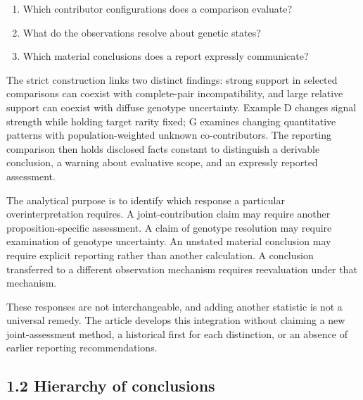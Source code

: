 \documentclass[
]{article}
\providecommand{\tightlist}{%
  \setlength{\itemsep}{0pt}\setlength{\parskip}{0pt}}
\begin{document}
\begin{enumerate}
\def\labelenumi{\arabic{enumi}.}
\tightlist
\item
  Which contributor configurations does a comparison evaluate?
\item
  What do the observations resolve about genetic states?
\item
  Which material conclusions does a report expressly communicate?
\end{enumerate}

The strict construction links two distinct findings: strong support in
selected comparisons can coexist with complete-pair incompatibility, and
large relative support can coexist with diffuse genotype uncertainty.
Example D changes signal strength while holding target rarity fixed; G
examines changing quantitative patterns with population-weighted unknown
co-contributors. The reporting comparison then holds disclosed facts
constant to distinguish a derivable conclusion, a warning about
evaluative scope, and an expressly reported assessment.

The analytical purpose is to identify which response a particular
overinterpretation requires. A joint-contribution claim may require
another proposition-specific assessment. A claim of genotype resolution
may require examination of genotype uncertainty. An unstated material
conclusion may require explicit reporting rather than another
calculation. A conclusion transferred to a different observation
mechanism requires reevaluation under that mechanism.

These responses are not interchangeable, and adding another statistic is
not a universal remedy. The article develops this integration without
claiming a new joint-assessment method, a historical first for each
distinction, or an absence of earlier reporting recommendations.

\subsection{1.2 Hierarchy of
conclusions}\label{hierarchy-of-conclusions}
\end{document}
